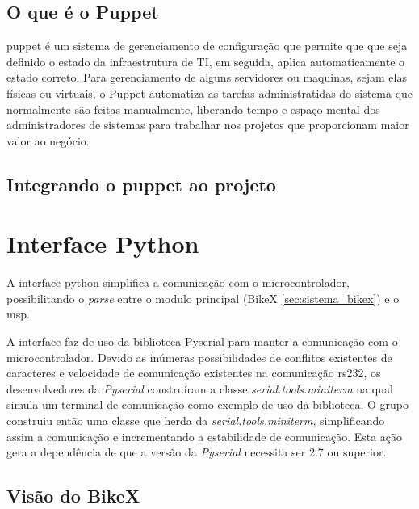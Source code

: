 \subsection{O que é o Puppet} %
\label{sub:o_que_o_puppet}

\gls{puppet} é um sistema de gerenciamento de configuração que permite que que seja definido o estado da infraestrutura de TI, em seguida, aplica automaticamente o estado correto. Para gerenciamento de alguns servidores ou maquinas, sejam elas físicas ou virtuais, o Puppet automatiza as tarefas administratidas do sistema que normalmente são feitas manualmente, liberando tempo e espaço mental dos administradores de sistemas para trabalhar nos projetos que proporcionam maior valor ao negócio.

\subsection{Integrando o puppet ao projeto} %
\label{sub:integrando_o_puppet_ao_projeto}


\section{Interface Python} %
\label{sec:interface_python}

A interface \gls{python} simplifica a comunicação com o microcontrolador, possibilitando o \textit{parse} entre o modulo principal (BikeX \ref{sec:sistema_bikex}) e o \gls{msp}.

A interface faz de uso da biblioteca \href{http://pyserial.sourceforge.net/pyserial.html}{Pyserial} para manter a comunicação com o microcontrolador. Devido as inúmeras possibilidades de conflitos existentes de caracteres e velocidade de comunicação existentes na comunicação \gls{rs232}, os desenvolvedores da \textit{Pyserial} construíram a classe \textit{serial.tools.miniterm} na qual simula um terminal de comunicação como exemplo de uso da biblioteca. O grupo construiu então uma classe que herda da \textit{serial.tools.miniterm}, simplificando assim a comunicação e incrementando a estabilidade de comunicação. Esta ação gera a dependência de que a versão da \textit{Pyserial} necessita ser 2.7 ou superior.

\subsection{Visão do BikeX} %
\label{sub:vis_o_do_bikex}

